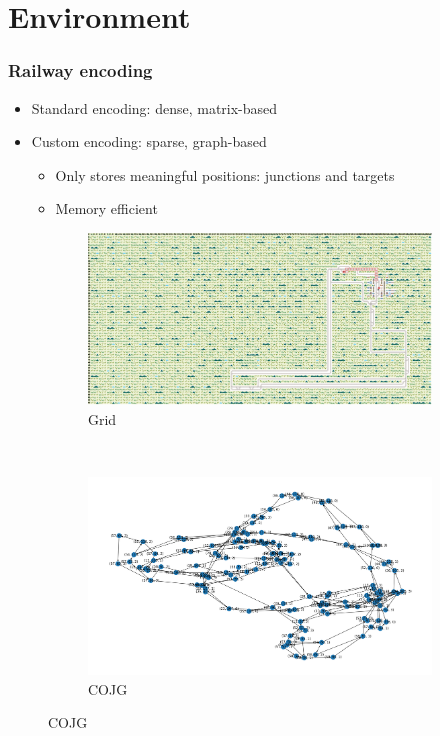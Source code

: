 \documentclass{beamer}
\begin{document}
\section{Environment}
\begin{frame}
	\frametitle{Railway encoding}
	\begin{itemize}
		\item Standard encoding: dense, matrix-based
		\item Custom encoding: sparse, graph-based
		\begin{itemize}
			\item Only stores meaningful positions: junctions and targets
			\item Memory efficient
		\end{itemize}
	\end{itemize}
	\begin{figure}[!h]
		\begin{subfigure}[b]{0.45\linewidth}
			\includegraphics[width=\textwidth]{grid-env-128x64.png}
			\caption{Grid}
		\end{subfigure}%
		~
		\begin{subfigure}[b]{0.45\linewidth}
			\includegraphics[width=\textwidth]{cojg-env-128x64.png}
			\caption{COJG}
		\end{subfigure}%
	\end{figure}
\end{frame}
\end{document}
